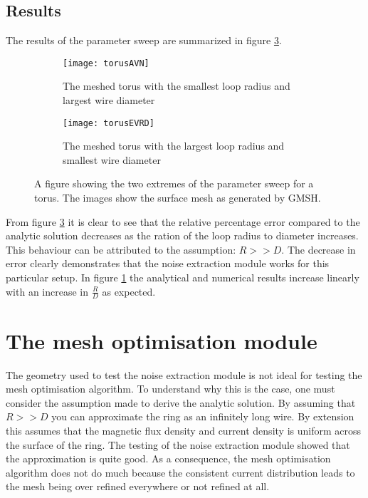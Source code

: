 \subsection{Results}

The results of the parameter sweep are summarized in figure \ref{fig:resTorus}.
\begin{figure}[H]
    \centering
    \begin{subfigure}[b]{0.48\textwidth}
        \centering
        \texttt{[image: torusAVN]}
        \caption{The meshed torus with the smallest loop radius and largest wire diameter}
        \label{fig:MSFNvRD}
    \end{subfigure}
    \hfill
    \begin{subfigure}[b]{0.48\textwidth}
        \centering
        \texttt{[image: torusEVRD]}
        \caption{The meshed torus with the largest loop radius and smallest wire diameter}
        \label{fig:evRD}
    \end{subfigure}
    \caption{A figure showing the two extremes of the parameter sweep for a torus. The images show the surface mesh as generated by GMSH.}
    \label{fig:resTorus}
\end{figure}
From figure \ref{fig:resTorus} it is clear to see that the relative percentage error compared to the analytic solution decreases as the ration of the loop radius to diameter increases. This behaviour can be attributed to the assumption: $R >> D$. The decrease in error clearly demonstrates that the noise extraction module works for this particular setup. In figure \ref{fig:MSFNvRD} the analytical and numerical results increase linearly with an increase in $\frac{R}{D}$ as expected.

\section{The mesh optimisation module}
The geometry used to test the noise extraction module is not ideal for testing the mesh optimisation algorithm. To understand why this is the case, one must consider the assumption made to derive the analytic solution. By assuming that $R >> D$ you can approximate the ring as an infinitely long wire. By extension this assumes that the magnetic flux density and current density is uniform across the surface of the ring. The testing of the noise extraction module showed that the approximation is quite good. As a consequence, the mesh optimisation algorithm does not do much because the consistent current distribution leads to the mesh being over refined everywhere or not refined at all.
